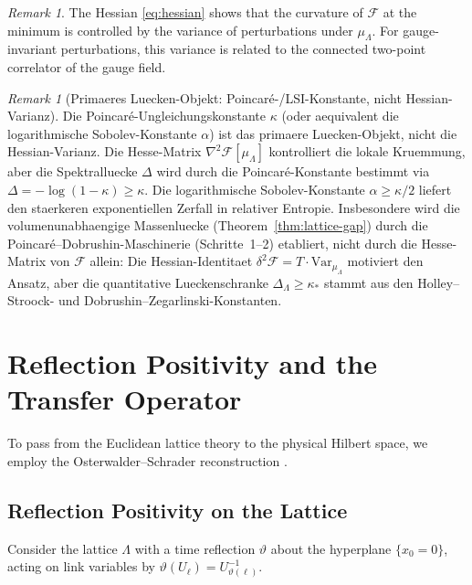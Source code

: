 \documentclass[12pt,a4paper]{article}
\theoremstyle{definition}
\theoremstyle{plain}
\theoremstyle{remark}
\newtheorem{remark}[definition]{Remark}
\begin{document}
\begin{remark}
The Hessian \eqref{eq:hessian} shows that the curvature of $\mathcal{F}$ at the minimum is controlled by the variance of perturbations under $\mu_\Lambda$. For gauge-invariant perturbations, this variance is related to the connected two-point correlator of the gauge field.
\end{remark}

\begin{remark}[Primaeres Luecken-Objekt: Poincar\'e-/LSI-Konstante, nicht Hessian-Varianz]
\label{rem:primary-gap-object}
Die Poincar\'e-Ungleichungskonstante $\kappa$ (oder aequivalent die logarithmische Sobolev-Konstante $\alpha$) ist das primaere Luecken-Objekt, nicht die Hessian-Varianz. Die Hesse-Matrix $\nabla^2 \mathcal{F}[\mu_\Lambda]$ kontrolliert die lokale Kruemmung, aber die Spektralluecke $\Delta$ wird durch die Poincar\'e-Konstante bestimmt via $\Delta = -\log(1-\kappa) \geq \kappa$. Die logarithmische Sobolev-Konstante $\alpha \geq \kappa/2$ liefert den staerkeren exponentiellen Zerfall in relativer Entropie. Insbesondere wird die volumenunabhaengige Massenluecke (Theorem~\ref{thm:lattice-gap}) durch die Poincar\'e--Dobrushin-Maschinerie (Schritte~1--2) etabliert, nicht durch die Hesse-Matrix von $\mathcal{F}$ allein: Die Hessian-Identitaet $\delta^2 \mathcal{F} = T \cdot \mathrm{Var}_{\mu_\Lambda}$ motiviert den Ansatz, aber die quantitative Lueckenschranke $\Delta_\Lambda \geq \kappa_*$ stammt aus den Holley--Stroock- und Dobrushin--Zegarlinski-Konstanten.
\end{remark}

\section{Reflection Positivity and the Transfer Operator}

To pass from the Euclidean lattice theory to the physical Hilbert space, we employ the Osterwalder--Schrader reconstruction \cite{OsterwalderSchrader1973, OsterwalderSchrader1975}.

\subsection{Reflection Positivity on the Lattice}

Consider the lattice $\Lambda$ with a time reflection $\vartheta$ about the hyperplane $\{x_0 = 0\}$, acting on link variables by $\vartheta(U_\ell) = U_{\vartheta(\ell)}^{-1}$.
\end{document}

